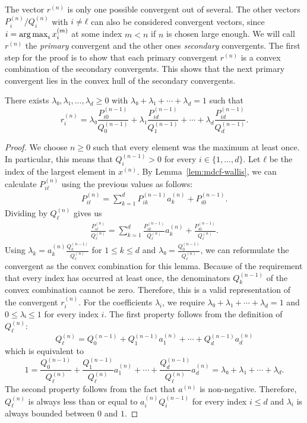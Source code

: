 The vector $r^{(n)}$ is only one possible convergent out of several.
The other vectors $P_i^{(n)}/Q_i^{(n)}$ with $i ≠ ℓ$ can also be considered convergent
vectors, since $i = \operatorname*{arg\,max}_i x_i^{(m)}$ at some index $m < n$ if $n$ is chosen large enough.
We will call $r^{(n)}$ the \emph{primary} convergent and the other ones \emph{secondary} convergents.
The first step for the proof is to show that each primary convergent $r^{(n)}$ is a
convex combination of the secondary convergents.
This shows that the next primary convergent lies in the convex hull of the
secondary convergents.

\begin{lemma}
  \label{lem:conv-conv}
  There exists $λ₀, λ₁, …, λ_d ≥ 0$ with $λ₀ + λ₁ + ⋯ + λ_d = 1$ such that
  \[
    r_i^{(n)} = λ₀ \frac{P_{i0}^{(n-1)}}{Q_0^{(n-1)}} + λ₁ \frac{P_{id}^{(n-1)}}{Q_1^{(n-1)}} + ⋯ + λ_d \frac{P_{id}^{(n-1)}}{Q_d^{(n-1)}}.
  \]
\end{lemma}

\begin{proof}
  We choose $n ≥ 0$ such that every element was the maximum at least once.
  In particular, this means that $Q_i^{(n-1)} > 0$ for every $i ∈ \{1, …, d\}$.
  Let $ℓ$ be the index of the largest element in $x^{(n)}$.
  By Lemma~\ref{lem:mdcf-wallis}, we can calculate $P_{iℓ}^{(n)}$ using the previous values as follows:
  \begin{align*}
    P_{iℓ}^{(n)} = \sum_{k = 1}^d P_{ik}^{(n-1)} a_k^{(n)} + P_{i0}^{(n-1)}.
  \end{align*}
  Dividing by $Q_ℓ^{(n)}$ gives us
  \begin{align*}
    \frac{P_{iℓ}^{(n)}}{Q_ℓ^{(n)}} = \sum_{k = 1}^d \frac{P_{ik}^{(n-1)}}{Q_ℓ^{(n)}} a_k^{(n)} + \frac{P_{i0}^{(n-1)}}{Q_ℓ^{(n)}}.
  \end{align*}
  Using $λ_k = a_k^{(n)} \frac{Q_k^{(n-1)}}{Q_ℓ^{(n)}}$ for $1 ≤ k ≤ d$ and $λ₀ = \frac{Q_0^{(n-1)}}{Q_ℓ^{(n)}}$,
  we can reformulate the convergent as the convex combination for this lemma.
  Because of the requirement that every index has occurred at least once,
  the denominators $Q_k^{(n-1)}$ of the convex combination cannot be zero.
  Therefore, this is a valid representation of the convergent $r_i^{(n)}$.
  For the coefficients $λ_i$, we require $λ₀ + λ₁ + ⋯ + λ_d = 1$ and $0 ≤ λᵢ ≤ 1$ for every index $i$.
  The first property follows from the definition of $Q_ℓ^{(n)}$:
  \[
    Q_ℓ^{(n)} = Q_0^{(n-1)} + Q_1^{(n-1)} a_1^{(n)} + ⋯ + Q_d^{(n-1)} a_d^{(n)}
  \]
  which is equivalent to
  \[
    1 = \frac{Q_0^{(n-1)}}{Q_ℓ^{(n)}} + \frac{Q_1^{(n-1)}}{Q_ℓ^{(n)}} a_1^{(n)} + ⋯ + \frac{Q_d^{(n-1)}}{Q_ℓ^{(n)}} a_d^{(n)} = λ₀ + λ₁ + ⋯ + λ_d.
  \]
  The second property follows from the fact that $a^{(n)}$ is non-negative.
  Therefore, $Q_ℓ^{(n)}$ is always less than or equal to $a_i^{(n)}
  Q_i^{(n-1)}$ for every index $i ≤ d$ and $λ_i$ is always bounded
  between $0$ and $1$.
\end{proof}

